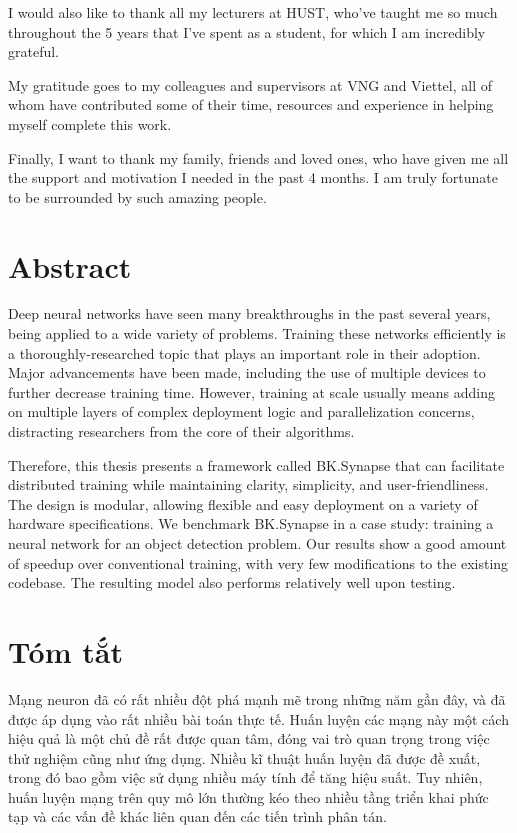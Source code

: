 \documentclass[a4paper, 13pt, oneside]{report}
\begin{document}
I would also like to thank all my lecturers at HUST, who've taught me so much throughout the 5 years that I've spent as a student, for which I am incredibly grateful.

My gratitude goes to my colleagues and supervisors at VNG and Viettel, all of whom have contributed some of their time, resources and experience in helping myself complete this work.

Finally, I want to thank my family, friends and loved ones, who have given me all the support and motivation I needed in the past 4 months. I am truly fortunate to be surrounded by such amazing people.

\pagebreak

\chapter*{Abstract}
Deep neural networks have seen many breakthroughs in the past several years, being applied to a wide variety of problems. Training these networks efficiently is a thoroughly-researched topic that plays an important role in their adoption. Major advancements have been made, including the use of multiple devices to further decrease training time. However, training at scale usually means adding on multiple layers of complex deployment logic and parallelization concerns, distracting researchers from the core of their algorithms. 

Therefore, this thesis presents a framework called BK.Synapse that can facilitate distributed training while maintaining clarity, simplicity, and user-friendliness. The design is modular, allowing flexible and easy deployment on a variety of hardware specifications. We benchmark BK.Synapse in a case study: training a neural network for an object detection problem. Our results show a good amount of speedup over conventional training, with very few modifications to the existing codebase. The resulting model also performs relatively well upon testing.

\chapter*{Tóm tắt}
Mạng neuron đã có rất nhiều đột phá mạnh mẽ trong những năm gần đây, và đã được áp dụng vào rất nhiều bài toán thực tế. Huấn luyện các mạng này một cách hiệu quả là một chủ đề rất được quan tâm, đóng vai trò quan trọng trong việc thử nghiệm cũng như ứng dụng. Nhiều kĩ thuật huấn luyện đã được đề xuất, trong đó bao gồm việc sử dụng nhiều máy tính để tăng hiệu suất. Tuy nhiên, huấn luyện mạng trên quy mô lớn thường kéo theo nhiều tầng triển khai phức tạp và các vấn đề khác liên quan đến các tiến trình phân tán. 
\end{document}
